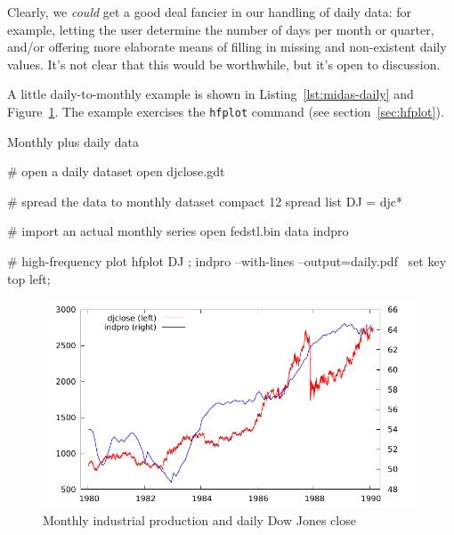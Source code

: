 Clearly, we \textit{could} get a good deal fancier in our handling of
daily data: for example, letting the user determine the number of days
per month or quarter, and/or offering more elaborate means of filling
in missing and non-existent daily values. It's not clear that this
would be worthwhile, but it's open to discussion.

A little daily-to-monthly example is shown in
Listing~\ref{lst:midas-daily} and Figure~\ref{fig:daily}. The example
exercises the \texttt{hfplot} command (see section~\ref{sec:hfplot}).

\begin{script}[htbp]
  \caption{Monthly plus daily data}
  \label{lst:midas-daily}
\begin{scode}
# open a daily dataset
open djclose.gdt

# spread the data to monthly
dataset compact 12 spread
list DJ = djc*

# import an actual monthly series
open fedstl.bin
data indpro

# high-frequency plot
hfplot DJ ; indpro --with-lines --output=daily.pdf \
 {set key top left;}
\end{scode}
\end{script}

\begin{figure}[htbp]
  \centering
  \includegraphics{figures/midas_daily_plot}
  \caption{Monthly industrial production and daily Dow Jones close}
  \label{fig:daily}
\end{figure}

